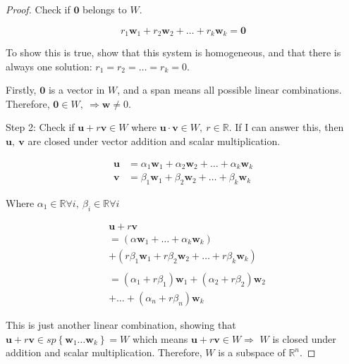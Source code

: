 \documentclass[12pt]{article}
\theoremstyle{plain}
\theoremstyle{remark}
\theoremstyle{definition}
\begin{document}
\begin{proof} Check if \(\mathbf{0}\) belongs to \(W\).

\[r_{1}{\mathbf{w}}_{1} + r_{2}{\mathbf{w}}_{2} + \ldots + r_{k}{\mathbf{w}}_{k} = \mathbf{0}\]

To show this is true, show that this system is homogeneous, and that
there is always one solution: \(r_{1} = r_{2} = \ldots = r_{k} = 0\).

Firstly, \(\mathbf{0}\) is a vector in \(W\), and a span means all
possible linear combinations. Therefore,
\(\mathbf{0} \in W,\  \Rightarrow \mathbf{w} \neq 0\).

Step 2: Check if \(\mathbf{u} + r\mathbf{v} \in W\) where
\(\mathbf{u} \cdot \mathbf{v} \in W,\ r\mathbb{\in R}\). If I
can answer this, then \(\mathbf{u},\ \mathbf{v}\) are closed
under vector addition and scalar multiplication.

\begin{align*}
\mathbf{u} &= \alpha_{1}{\mathbf{w}}_{1} + \alpha_{2}{\mathbf{w}}_{2} + \ldots + \alpha_{k}{\mathbf{w}}_{k} \\
\mathbf{v} &= \beta_{1}{\mathbf{w}}_{1} + \beta_{2}{\mathbf{w}}_{2} + \ldots + \beta_{k}{\mathbf{w}}_{k}
\end{align*}


Where
\(\alpha_{1}\mathbb{\in R\forall}i,\ \beta_{i}\mathbb{\in R\forall}i\)

\begin{align*}
&\mathbf{u} + r\mathbf{v}  \\
&= \left( \alpha{\mathbf{w}}_{1} + \ldots + \alpha_{k}{\mathbf{w}}_{k} \right)  \\
&+ \left( r\beta_{1}{\mathbf{w}}_{1} + r\beta_{2}{\mathbf{w}}_{2} + \ldots + r\beta_{k}{\mathbf{w}}_{k} \right) \\
& \\
&= \left( \alpha_{1} + r\beta_{1} \right){\mathbf{w}}_{1} + \left( \alpha_{2} + r\beta_{2} \right){\mathbf{w}}_{2}  \\
&+ \ldots + \left( \alpha_{n} + r\beta_{n} \right){\mathbf{w}}_{k}
\end{align*}


This is just another linear combination, showing that
\(\mathbf{u} + r\mathbf{v} \in sp\left\{ {\mathbf{w}}_{1}\ldots{\mathbf{w}}_{k} \right\} = W\)
which means \(\mathbf{u} + r\mathbf{v} \in W \Rightarrow\) \(W\)
is closed under addition and scalar multiplication. Therefore, \(W\) is
a subspace of \(\mathbb{R}^{n}\).



\end{proof}
\end{document}
